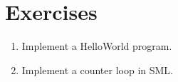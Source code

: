 \section{Exercises}

\begin{enumerate}

\item Implement a HelloWorld program.

\item Implement a counter loop in SML.

\end{enumerate}
